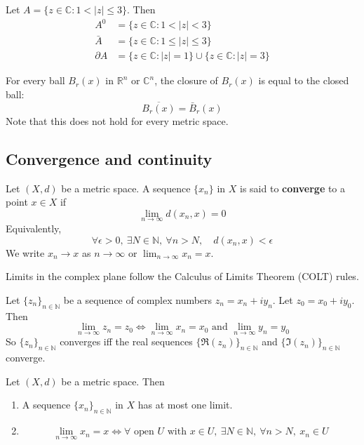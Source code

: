\begin{example}
	Let $A = \{ z \in \mathbb{C}: 1 < |z| \le 3 \}$. Then
	\[
		\begin{aligned}
			A^0 & = \{ z \in \mathbb{C}: 1 < |z| < 3 \} \\
			\bar{A} & = \{ z \in \mathbb{C}: 1 \le |z| \le 3 \} \\
			\partial A & = \{ z \in \mathbb{C}: |z| = 1 \} \cup \{ z \in \mathbb{C}: |z| = 3 \}
		\end{aligned}
	\]
\end{example}

\begin{example}
	For every ball $B_r(x)$ in $\mathbb{R}^n$ or $\mathbb{C}^n$, the closure of $B_r(x)$ is equal to the closed ball:
	\[
		\overline{B_r(x)} = \bar{B}_r(x)
	\]
	Note that this does not hold for every metric space.
\end{example}

\subsection{Convergence and continuity}

\begin{definition}
	Let $(X, d)$ be a metric space. A sequence $\{ x_n \}$ in $X$ is said to \textbf{converge} to a point $x \in X$ if
	\[
		\lim_{n \rightarrow \infty} d(x_n, x) = 0
	\]
	Equivalently,
	\[
		\forall \epsilon > 0, \ \exists N \in \mathbb{N}, \ \forall n > N, \quad d(x_n, x) < \epsilon
	\]
	We write $x_n \rightarrow x$ as $n \rightarrow \infty$ or $\lim_{n \rightarrow \infty} x_n = x$.
\end{definition}

\begin{proposition}
	Limits in the complex plane follow the Calculus of Limits Theorem (COLT) rules.
\end{proposition}

\begin{proposition}
	Let $\{ z_n \}_{n \in \mathbb{N}}$ be a sequence of complex numbers $z_n = x_n + i y_n$. Let $z_0 = x_0 + i y_0$. Then
	\[
		\lim_{n \rightarrow \infty} z_n = z_0 \Longleftrightarrow \lim_{n \rightarrow \infty} x_n = x_0 \text{ and } \lim_{n \rightarrow \infty} y_n = y_0
	\]
	So $\{ z_n \}_{n \in \mathbb{N}}$ converges iff the real sequences $\{ \Re(z_n) \}_{n \in \mathbb{N}}$ and $\{ \Im(z_n) \}_{n \in \mathbb{N}}$ converge.
\end{proposition}

\begin{lemma}\label{lem:sequenceLimitUnique}
	Let $(X, d)$ be a metric space. Then
	\begin{enumerate}
		\item A sequence $\{ x_n \}_{n \in \mathbb{N}}$ in $X$ has at most one limit.
		\item \[
			\lim_{n \rightarrow \infty} x_n = x \Longleftrightarrow \forall \text{ open } U \text{ with } x \in U, \ \exists N \in \mathbb{N}, \ \forall n > N, \ x_n \in U
		\]
	\end{enumerate}
\end{lemma}


